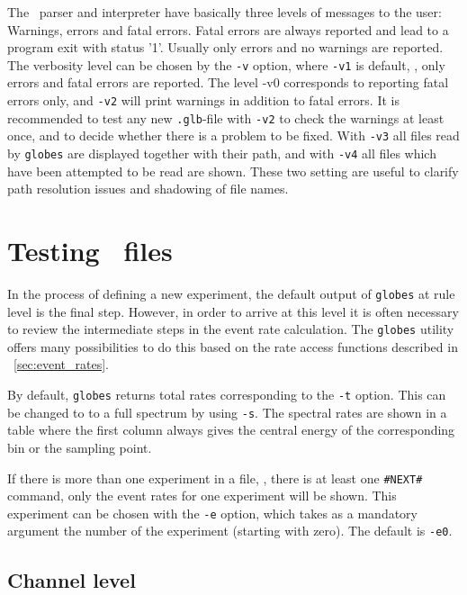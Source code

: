 The \AEDL\ parser and interpreter have basically three levels of messages to
the user: Warnings, errors and fatal errors. 
Fatal errors are always reported and lead to a 
program exit with status '1'. Usually only errors and no warnings
are reported. The verbosity level can be chosen by the {\tt -v} option, where {\tt -v1} is default, \ie, only errors and fatal errors are reported. The level {-v0} corresponds to reporting fatal errors only, and {\tt -v2} will print warnings in addition to fatal errors. It is recommended
to test any new {\tt .glb}-file with {\tt -v2} to check the warnings at least once, and to decide whether there is a problem to be fixed. With {\tt -v3} all files read by {\tt globes} are displayed together with their path, and with  {\tt -v4} all files which have been attempted to be read are shown.
These two setting are useful to clarify path resolution issues and shadowing
of file names.

\section{Testing \AEDL\ files}
\label{sec:globes_test}

In the process of defining a new experiment, the default output of {\tt globes} at rule level is the final step. However, in order to arrive 
at this level it is often necessary to review the intermediate steps in the event rate calculation. The {\tt globes} utility offers many possibilities to do this based on the rate access functions described in \Sec~\ref{sec:event_rates}.

By default, {\tt globes} returns total rates corresponding to the 
{\tt -t} option. This can be changed to
to a full spectrum by using {\tt -s}. The spectral rates are shown in a
table where the first column always gives the central energy of the
corresponding bin or the sampling point.

If there is more than one experiment in a file, \ie, there is at least one 
{\tt \#NEXT\#} command, only the event rates for one experiment will be shown.  This experiment can be chosen with the {\tt -e} option, which takes 
as a mandatory argument the number of the experiment (starting with zero).
The default is {\tt -e0}.

\subsection*{Channel level}

